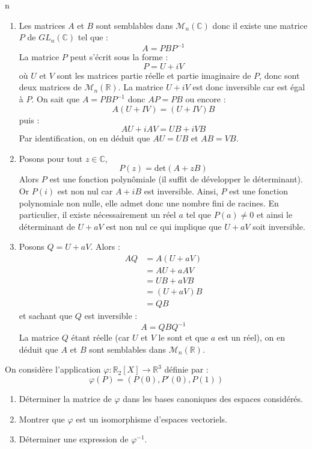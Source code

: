 n\documentclass[a4paper,10pt]{report}
\begin{document}
\corr \begin{enumerate}
\item Les matrices $A$ et $B$ sont semblables dans $\mathcal{M}_n(\mathbb{C})$ donc il existe une matrice $P$ de $GL_n(\mathbb{C})$ tel que :
$$ A=PBP^{-1}$$
La matrice $P$ peut s'écrit sous la forme :
$$ P = U+i V$$
où $U$ et $V$ sont les matrices \og partie réelle \fg et \og partie imaginaire \fg de $P$, donc sont deux matrices de $\mathcal{M}_n(\mathbb{R})$. La matrice $U+iV$ est donc inversible car est égal à $P$. On sait que $A=PBP^{-1}$ donc $AP=PB$ ou encore :
$$ A(U+IV) = (U+IV)B$$
puis :
$$ AU+ i AV = UB + i VB$$
Par identification, on en déduit que $AU=UB$ et $AB=VB$.
\item Posons pour tout $z \in \mathbb{C}$,
$$ P(z) = \textrm{det}(A+zB)$$
Alors $P$ est une fonction polynômiale (il suffit de développer le déterminant). Or $P(i)$ est non nul car $A+iB$ est inversible. Ainsi, $P$ est une fonction polynomiale non nulle, elle admet donc une nombre fini de racines. En particulier, il existe nécessairement un réel $a$ tel que $P(a) \neq 0$ et ainsi le déterminant de $U+aV$ est non nul ce qui implique que $U+aV$ soit inversible.
\item Posons $Q=U+aV$. Alors :
\begin{align*}
AQ & = A(U+aV) \\
& = AU + a AV \\
& = UB + a VB \\
& = (U+aV)B \\
& = QB
\end{align*}
et sachant que $Q$ est inversible :
$$ A= QBQ^{-1}$$
La matrice $Q$ étant réelle (car $U$ et $V$ le sont et que $a$ est un réel), on en déduit que $A$ et $B$ sont semblables dans $\mathcal{M}_n(\mathbb{R})$.
\end{enumerate}

\begin{Exa} On considère l'application $\varphi : \mathbb{R}_2[X] \rightarrow \mathbb{R}^3$ définie par :
\[ \varphi(P)=(P(0),P'(0),P(1)) \]

\begin{enumerate}
\item Déterminer la matrice de $\varphi$ dans les bases canoniques des espaces considérés.
\item Montrer que $\varphi$ est un isomorphisme d'espaces vectoriels.
\item Déterminer une expression de $\varphi^{-1}$.
\end{enumerate}
\end{Exa} 
\end{document}
